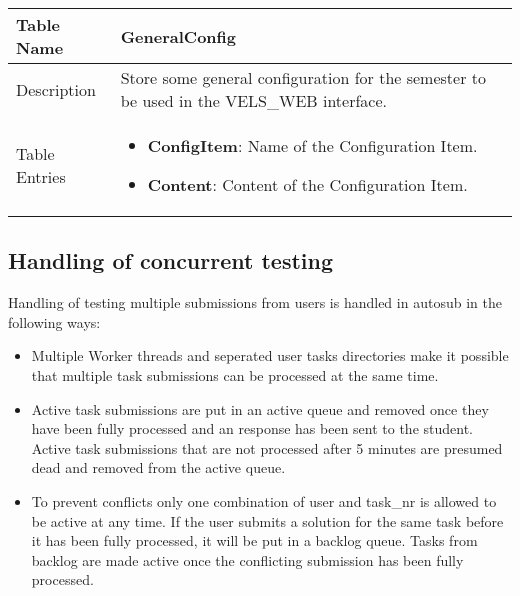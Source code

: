 \begin{tabular}{|p{3cm}|p{10cm}|}
\hline
Table Name & GeneralConfig \\
\hline
Description & Store some general configuration for the semester to be used in the
VELS\_WEB interface. \\
\hline
Table Entries & \begin{itemize}
    \item {\bf ConfigItem}: Name of the Configuration Item.
    \item {\bf Content}: Content of the Configuration Item.
    \end{itemize} \\
\hline
\end{tabular}

\subsection{Handling of concurrent testing}
Handling of testing multiple submissions from users is handled in autosub in the following ways:
\begin{itemize}
\item Multiple Worker threads and seperated user tasks directories make it possible that
	multiple task submissions can be processed at the same time.
\item Active task submissions are put in an active queue and removed once they have been fully
	processed and an response has been sent to the student. Active task submissions that are
	not processed after 5 minutes are presumed dead and removed from the active queue.
\item To prevent conflicts only one combination of user and task\_nr is allowed to be active at any
	time. If the user submits a solution for the same task before it has been fully processed, it
	will be put in a backlog queue. Tasks from backlog are made active once the conflicting
	submission has been fully processed.
\end{itemize}
